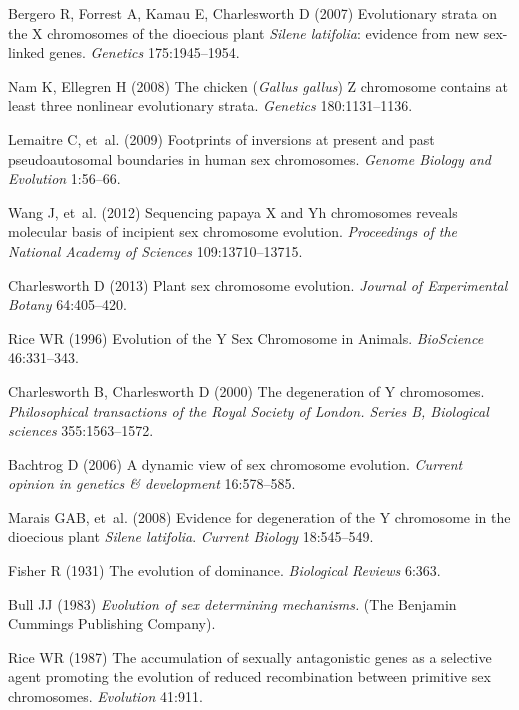 \begin{thebibliography}{20}

Bergero R, Forrest A, Kamau E, Charlesworth D
 (2007) {Evolutionary strata on the X chromosomes of the dioecious
  plant \textit{Silene latifolia}: evidence from new sex-linked genes}.
 \textit{Genetics} 175:1945--1954.

Nam K, Ellegren H
 (2008) {The chicken (\textit{Gallus gallus}) Z chromosome contains at
  least three nonlinear evolutionary strata}.
 \textit{Genetics} 180:1131--1136.

Lemaitre C, {et~al.}
 (2009) {Footprints of inversions at present and past pseudoautosomal
  boundaries in human sex chromosomes}.
 \textit{Genome Biology and Evolution} 1:56--66.

Wang J, {et~al.}
 (2012) {Sequencing papaya X and Yh chromosomes reveals molecular
  basis of incipient sex chromosome evolution.}
 \textit{Proceedings of the National Academy of Sciences}
  109:13710--13715.

Charlesworth D
 (2013) {Plant sex chromosome evolution.}
 \textit{Journal of Experimental Botany} 64:405--420.

Rice WR
 (1996) {Evolution of the Y Sex Chromosome in Animals}.
 \textit{BioScience} 46:331--343.

Charlesworth B, Charlesworth D
 (2000) {The degeneration of Y chromosomes.}
 \textit{Philosophical transactions of the Royal Society of London.
  Series B, Biological sciences} 355:1563--1572.

Bachtrog D
 (2006) {A dynamic view of sex chromosome evolution.}
 \textit{Current opinion in genetics {\&} development} 16:578--585.

Marais GAB, {et~al.}
 (2008) {Evidence for degeneration of the Y chromosome in the
  dioecious plant \textit{Silene latifolia}}.
 \textit{Current Biology} 18:545--549.

Fisher R
 (1931) {The evolution of dominance}.
 \textit{Biological Reviews} 6:363.

Bull JJ
 (1983) \textit{{Evolution of sex determining mechanisms.}}
 (The Benjamin Cummings Publishing Company).

Rice WR
 (1987) {The accumulation of sexually antagonistic genes as a
  selective agent promoting the evolution of reduced recombination between
  primitive sex chromosomes}.
 \textit{Evolution} 41:911.


\end{thebibliography}
